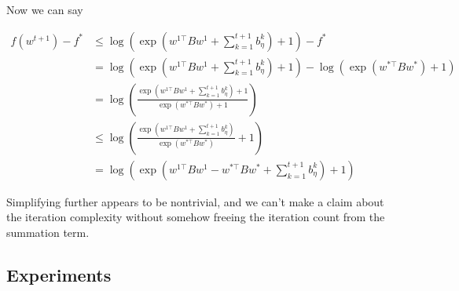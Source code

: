 \documentclass[11pt]{article}
\begin{document}
Now we can say

\begin{align*}
    f(w^{t+1}) - f^* &\leq \log( \exp(w^{1\top}Bw^{1} + \sum_{k=1}^{t+1} b_\eta^k) + 1) - f^* \\
    &= \log( \exp(w^{1\top}Bw^{1} + \sum_{k=1}^{t+1} b_\eta^k) + 1) - \log( \exp(w^{*\top}Bw^{*}) + 1) \\
    &= \log \left( \frac{\exp(w^{1\top}Bw^{1} + \sum_{k=1}^{t+1} b_\eta^k) + 1}{\exp(w^{*\top}Bw^{*}) + 1} \right) \\
    &\leq \log \left( \frac{\exp(w^{1\top}Bw^{1} + \sum_{k=1}^{t+1} b_\eta^k)}{\exp(w^{*\top}Bw^{*})} + 1 \right) \\
    &= \log \left( \exp \left(w^{1\top}Bw^{1} - w^{*\top}Bw^{*} + \sum_{k=1}^{t+1} b_\eta^k \right) + 1 \right)
\end{align*}

Simplifying further appears to be nontrivial, and we can't make a claim about the iteration complexity without somehow freeing the iteration count from the summation term.

\subsection{Experiments}





\end{document}
